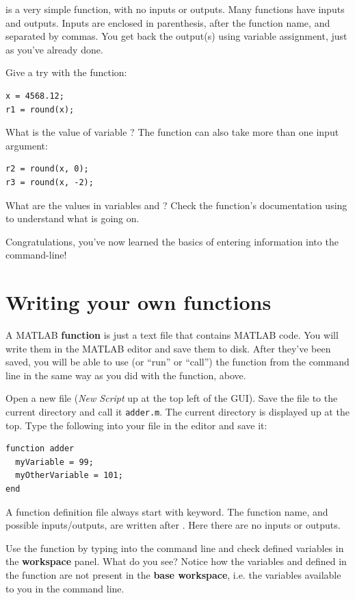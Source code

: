 \documentclass{article}
\begin{document}
 is a very simple function, with no inputs or outputs.
Many functions have inputs and outputs.
Inputs are enclosed in parenthesis, after the function name, and separated by commas.
You get back the output(s) using variable assignment, just as you've already done.

Give a try with the  function:
\begin{lstlisting}
x = 4568.12;
r1 = round(x);
\end{lstlisting}
What is the value of variable ? The  function can also take more than one input argument:
\begin{lstlisting}
r2 = round(x, 0);
r3 = round(x, -2);
\end{lstlisting}
What are the values in variables  and ?
Check the function's documentation using  to understand what is going on.

Congratulations, you've now learned the basics of entering information into the command-line!


\section{Writing your own functions}

A MATLAB \textbf{function} is just a text file that contains MATLAB code.
You will write them in the MATLAB editor and save them to disk.
After they've been saved, you will be able to use (or ``run'' or ``call'') the function from the command line in the same way as you did with the  function, above.

Open a new file (\emph{New Script} up at the top left of the GUI).
Save the file to the current directory and call it \verb|adder.m|.
The current directory is displayed up at the top.
Type the following into your file in the editor and save it:
\begin{lstlisting}
function adder
  myVariable = 99;
  myOtherVariable = 101;
end
\end{lstlisting}
A function definition file always start with  keyword.
The function name, and possible inputs/outputs, are written after .
Here there are no inputs or outputs.

Use the function by typing  into the command line and check defined variables in the \textbf{workspace} panel. What do you see?
Notice how the variables  and  defined in the  function are not present in the \textbf{base workspace}, i.e. the variables available to you in the command line.
\end{document}
